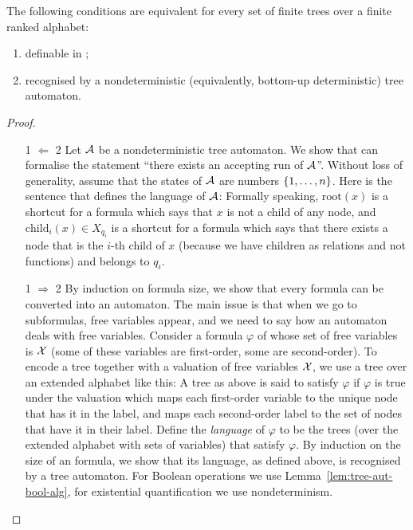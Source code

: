 \begin{theorem}\label{thm:thatcher-wright}
The following conditions are equivalent for every set of finite trees over a finite ranked alphabet:
\begin{enumerate}
	\item  definable in \mso;
	\item  recognised by a nondeterministic (equivalently, bottom-up deterministic) tree automaton.
\end{enumerate}
\end{theorem}
\begin{proof}\ 
\begin{itemize}
	\item[1 $\Leftarrow$ 2] Let $\mathcal{A}$ be a nondeterministic tree automaton. We show that \mso can formalise the statement ``there exists an accepting run of $\mathcal{A}$''. Without loss of generality, assume that the states of $\mathcal{A}$ are numbers $\{1,\ldots,n\}$. Here is the sentence that defines the language of $\mathcal{A}$: 
	 Formally speaking, $\mathrm{root}(x)$ is a shortcut for a formula which says that $x$ is not a child of any node, and $\mathrm{child}_i(x) \in X_{q_i}$ is a shortcut for a formula which says that there exists a node that is the $i$-th child of $x$ (because we have children as relations and not functions) and belongs to $q_i$. 
	\item[1 $\Rightarrow$ 2] By induction on formula  size, we show that every \mso formula can be converted into an automaton. The  main issue is that when we go to subformulas, free variables appear, and  we need to say how an automaton deals with free variables. Consider a formula $\varphi$ of \mso whose set of free variables is $\mathcal{X}$ (some of these variables are first-order, some are second-order). To encode a tree together with a valuation of free variables $\mathcal{X}$, we use a tree over an extended alphabet like this: 
	A tree as above is said to satisfy $\varphi$ if $\varphi$ is true under the valuation which maps each first-order variable to the unique node that has it in the label, and maps each second-order label to the set of nodes that have it in their label. Define the \emph{language} of $\varphi$ to be the trees (over the extended alphabet with sets of variables) that satisfy $\varphi$. 
By induction on the size of an \mso formula, we show that its language, as defined above, is recognised by a tree automaton.  For Boolean operations we use Lemma~\ref{lem:tree-aut-bool-alg}, for existential quantification we use nondeterminism.
\end{itemize}
\end{proof}

